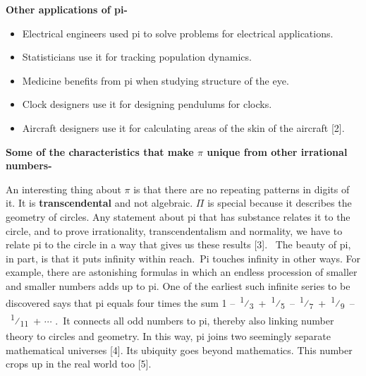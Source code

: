 \documentclass[12pt]{article}
\begin{document}
\begin{justify}
\textbf{Other applications of pi-}
\end{justify}\par

\begin{itemize}
	\item Electrical engineers used pi to solve problems for electrical applications.\par

	\item Statisticians use it for tracking population dynamics. \par

	\item Medicine benefits from pi when studying structure of the eye.\par

	\item Clock designers use it for designing pendulums for clocks.\par

	\item Aircraft designers use it for calculating areas of the skin of the aircraft [2].
\end{itemize}\par


\vspace{\baselineskip}
\begin{justify}
\textbf{Some of the characteristics that make $ \pi $  unique from other irrational numbers-}
\end{justify}\par

\begin{justify}
An interesting thing about $ \pi $  is that there are no repeating patterns in digits of it. It is \textbf{transcendental} and not algebraic. $ \Pi $  is special because it describes the geometry of circles. Any statement about pi that has substance relates it to the circle, and to prove irrationality, transcendentalism and normality, we have to relate pi to the circle in a way that gives us these results [3].  The beauty of pi, in part, is that it puts infinity within reach. Pi touches infinity in other ways. For example, there are astonishing formulas in which an endless procession of smaller and smaller numbers adds up to pi. One of the earliest such infinite series to be discovered says that pi equals four times the sum 1 – \textsuperscript{1}⁄\textsubscript{3} + \textsuperscript{1}⁄\textsubscript{5} – \textsuperscript{1}⁄\textsubscript{7} + \textsuperscript{1}⁄\textsubscript{9} – \textsuperscript{1}⁄\textsubscript{11} + $ \cdots $ . It connects all odd numbers to pi, thereby also linking number theory to circles and geometry. In this way, pi joins two seemingly separate mathematical universes [4]. Its ubiquity goes beyond mathematics. This number crops up in the real world too [5].
\end{justify}\par


\vspace{\baselineskip}

\vspace{\baselineskip}

\vspace{\baselineskip}

\vspace{\baselineskip}

\printbibliography
\end{document}
